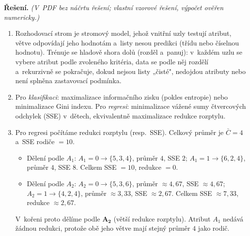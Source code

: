 \medskip
\noindent\textbf{Řešení.} \textit{(V~PDF bez náčrtu řešení; vlastní vzorové řešení, výpočet ověřen numericky.)}\par
\begin{enumerate}[nosep]
  \item Rozhodovací strom je stromový model, jehož vnitřní uzly testují atribut, větve odpovídají jeho hodnotám a~listy nesou predikci (třídu nebo číselnou hodnotu). Trénuje se hladově shora dolů (rozděl a~panuj): v~každém uzlu se vybere atribut podle zvoleného kritéria, data se podle něj rozdělí a~rekurzivně se pokračuje, dokud nejsou listy „čisté", nedojdou atributy nebo není splněna zastavovací podmínka.
  \item Pro \emph{klasifikaci}: maximalizace informačního zisku (pokles entropie) nebo minimalizace Gini indexu. Pro \emph{regresi}: minimalizace vážené sumy čtvercových odchylek (SSE) v~dětech, ekvivalentně maximalizace redukce rozptylu.
  \item Pro regresi počítáme redukci rozptylu (resp.\ SSE). Celkový průměr je $\bar{C}=4$ a~SSE rodiče $=10$.
    \begin{itemize}
      \item Dělení podle $A_1$: $A_1{=}0 \to \{5,3,4\}$, průměr $4$, SSE $2$; $A_1{=}1 \to \{6,2,4\}$, průměr $4$, SSE $8$. Celkem SSE $=10$, redukce $=0$.
      \item Dělení podle $A_2$: $A_2{=}0 \to \{5,3,6\}$, průměr $\approx 4{,}67$, SSE $\approx 4{,}67$; $A_2{=}1 \to \{4,2,4\}$, průměr $\approx 3{,}33$, SSE $\approx 2{,}67$. Celkem SSE $\approx 7{,}33$, redukce $\approx 2{,}67$.
    \end{itemize}
    V~kořeni proto dělíme podle $\boldsymbol{A_2}$ (větší redukce rozptylu). Atribut $A_1$ nedává žádnou redukci, protože obě jeho větve mají stejný průměr $4$ jako rodič.
\end{enumerate}

